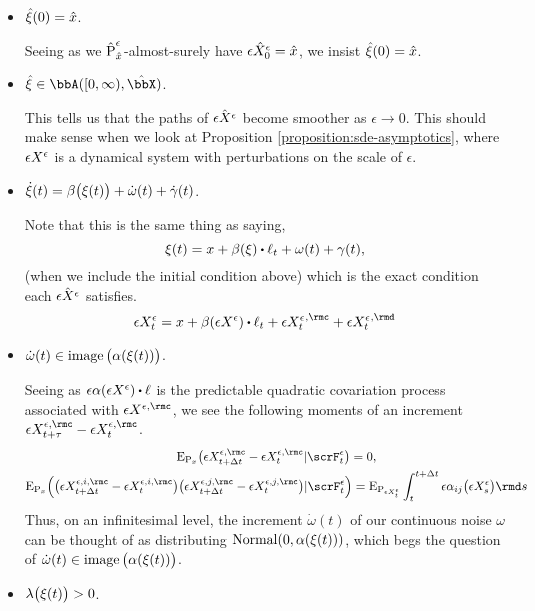 \begin{itemize}
  \item
    $\hat{\xi}(0) = \hat{x}$.

    Seeing as we $\hat{{\operatorname{P}}}^\epsilon_{\hat{x}}$-almost-surely have $\epsilon\hat{X}^\epsilon_0 = \hat{x}$, we insist $\hat{\xi}(0) = \hat{x}$.
  \item
    $\hat\pathVar \in \acpathSpace{[0,\infty)}{\hat\stateSpace}$.

    This tells us that the paths of $\hat{\epsilon X^\epsilon}$ become smoother as $\epsilon \rightarrow 0$.
    This should make sense when we look at Proposition \ref{proposition:sde-asymptotics}, where $\epsilon X^\epsilon$ is a dynamical system with perturbations on the scale of $\epsilon$.
  \item
    $\dot{\xi}(t) = \beta\big(\xi(t)\big) + \dot\omega(t) + \dot\gamma(t)$.

    Note that this is the same thing as saying,
    \[
      \pathVar(t) = \stateVar + \affDrift(\pathVar) \shortInt \leb_t + \omega(t) + \gamma(t),
    \]
    (when we include the initial condition above) which is the exact condition each $\hat{\epsilon X^\epsilon}$ satisfies.
    \[
      \Xe_t = \stateVar + \affDrift(\Xe) \shortInt \leb_t + {\Xe_t}^{,\rmc} + {\Xe_t}^{,\rmd}
    \]
  \item
    $\dot\omega(t) \in \operatorname{image}\big(\alpha(\xi(t))\big)$.

    Seeing as $\epsilon \affDiff(\Xe) \shortInt \leb$ is the predictable quadratic covariation process associated with $\epsilon\X^{\epsilon,\rmc}$, we see the following moments of an increment $\epsilon\X^{\epsilon,\rmc}_{t+\tau}-\epsilon\X^{\epsilon,\rmc}_t$.
    \begin{gather*}
      \Exp_{\Prb_\stateVar}\big( \epsilon\X^{\epsilon,\rmc}_{t+\Delta t} - \epsilon\X^{\epsilon,\rmc}_t  | \scrF^\epsilon_t \big) = 0, \\
      \Exp_{\Prb_\stateVar}\Big(\big( \epsilon\X^{\epsilon,i,\rmc}_{t+\Delta t} -  \epsilon\X^{\epsilon,i,\rmc}_t \big) \big( \epsilon\X^{\epsilon,j,\rmc}_{t+\Delta t} -  \epsilon\X^{\epsilon,j,\rmc}_t \big) | \scrF^\epsilon_t \Big) = \Exp_{\Prb_{\Xe_t}} \int_t^{t+\Delta t} \epsilon\affDiff_{ij}\big(\Xe_s\big) \rmd s
    \end{gather*}
    Thus, on an infinitesimal level, the increment $\dot\omega(t)$ of our continuous noise $\omega$ can be thought of as distributing $\operatorname{Normal}(0, \alpha(\xi(t)))$, which begs the question of $\dot\omega(t) \in \operatorname{image}\big(\alpha(\xi(t))\big)$.
  \item
    $\lambda\big(\xi(t)\big) > 0$.
    

\end{itemize}
